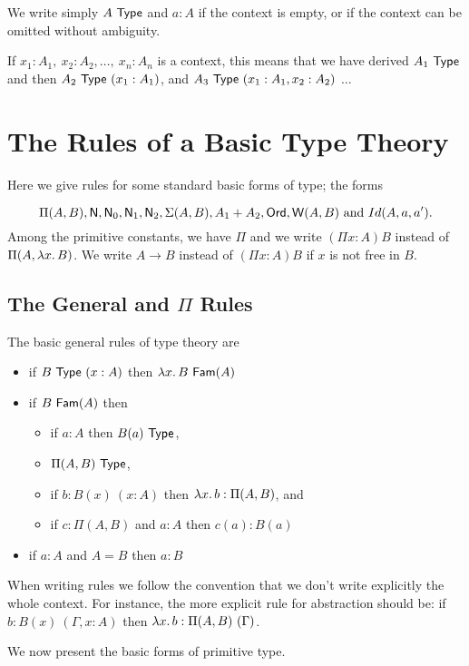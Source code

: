 { We write simply $A~{\sf Type}$ and $a:A$ if the context is empty, or if the context
can be omitted without ambiguity.

 If $x_1:A_1,~x_2:A_2,\dots,~x_n:A_n$ is a context, this means that we have
derived $A_1~{\sf Type}$ and then $A_2~{\sf Type}~(x_1:A_1)$, and $A_3~{\sf Type}~(x_1:A_1,x_2:A_2)$
$\dots$

\medskip

\section*{The Rules of a Basic Type Theory}
Here we give rules for some standard basic forms of type; the forms 

  $$\Pi(A,B),{\sf N},{\sf N}_0,{\sf N}_1,{\sf N}_2,\Sigma(A,B),A_1+A_2,{\sf Ord},{\sf W}(A,B)
    \mbox{ and }Id(A,a,a').$$
%
Among the primitive constants, we have $\Pi$ and we write $(\Pi x:A)B$ instead
of $\Pi(A,\lam{x} B)$. We write $A\rightarrow B$ instead of $(\Pi x:A)B$ if
$x$ is not free in $B$.

\medskip

\subsection{The General and $\Pi$ Rules}
 The basic general rules of type theory are 
\begin{itemize}
\item if $B~{\sf Type}~(x:A)$ then $\lam{x} B~\Fam(A)$
\item if $B~{\sf Fam}(A)$ then 
\begin{itemize}
\item if $a:A$ then $B(a)~{\sf Type}$,
\item $\Pi(A,B)~{\sf Type}$,
\item if $b:B(x)~(x:A)$ then $\lam{x} b:\Pi(A,B)$, and
\item if $c:\Pi(A,B)$ and $a:A$ then $c(a):B(a)$
\end{itemize}
\item if $a:A$ and $A= B$ then $a:B$
\end{itemize}

\medskip

 When writing rules we follow the convention that we don't write explicitly the whole context.  For instance, the more explicit rule for abstraction should be: if $b:B(x)~(\Gamma,x:A)$ then $\lam{x} b:\Pi(A,B)~(\Gamma)$.

\medskip

We now present the basic forms of primitive type.  

}
